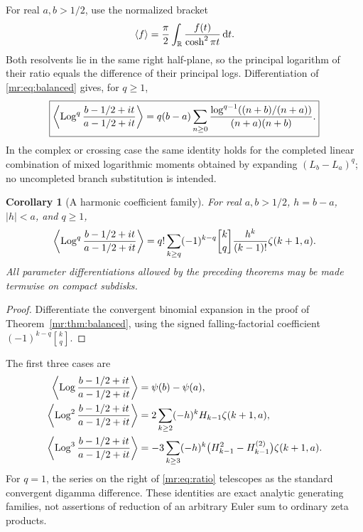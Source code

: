 \documentclass[11pt,letterpaper]{article}
\newtheorem{corollary}[theorem]{Corollary}
\theoremstyle{definition}\newtheorem{definition}[theorem]{Definition}
\theoremstyle{remark}\newtheorem{remark}[theorem]{Remark}
\newcommand{\dd}{\,\mathrm d}\newcommand{\M}{\mathcal M}
\newcommand{\stir}[2]{\genfrac{[}{]}{0pt}{}{#1}{#2}}
\begin{document}
For real $a,b>1/2$, use the normalized bracket
\begin{equation}\label{mr:eq:bracket}
 \langle f\rangle=\frac\pi2\int_\R\frac{f(t)}{\cosh^2\pi t}\dd t.
\end{equation}
Both resolvents lie in the same right half-plane, so the principal
logarithm of their ratio equals the difference of their principal logs.
Differentiation of \eqref{mr:eq:balanced} gives, for $q\ge1$,
\begin{equation}\label{mr:eq:ratio}
 \boxed{\left\langle
 \operatorname{Log}^q\frac{b-1/2+it}{a-1/2+it}\right\rangle
 =q(b-a)\sum_{n\ge0}
 \frac{\log^{q-1}((n+b)/(n+a))}{(n+a)(n+b)}.}
\end{equation}
In the complex or crossing case the same identity holds for the
completed linear combination of mixed logarithmic moments obtained by
expanding $(L_b-L_a)^q$; no uncompleted branch substitution is intended.

\begin{corollary}[A harmonic coefficient family]\label{mr:cor:harmonic}
For real $a,b>1/2$, $h=b-a$, $|h|<a$, and $q\ge1$,
\begin{equation}\label{mr:eq:harmonic}
 \left\langle\Log^q\frac{b-1/2+it}{a-1/2+it}\right\rangle
 =q!\sum_{k\ge q}(-1)^{k-q}\stir{k}{q}
       \frac{h^k}{(k-1)!}\zeta(k+1,a).
\end{equation}
All parameter differentiations allowed by the preceding theorems may
be made termwise on compact subdisks.
\end{corollary}
\begin{proof}
Differentiate the convergent binomial expansion in the proof of
Theorem~\ref{mr:thm:balanced}, using the signed falling-factorial
coefficient $(-1)^{k-q}\stir{k}{q}$.
\end{proof}
The first three cases are
\begin{align}
 \left\langle\operatorname{Log}\frac{b-1/2+it}{a-1/2+it}\right\rangle
 &=\psi(b)-\psi(a),\label{mr:eq:ratio1}\\
 \left\langle\operatorname{Log}^2\frac{b-1/2+it}{a-1/2+it}\right\rangle
 &=2\sum_{k\ge2}(-h)^kH_{k-1}\zeta(k+1,a),\label{mr:eq:ratio2}\\
 \left\langle\operatorname{Log}^3\frac{b-1/2+it}{a-1/2+it}\right\rangle
 &=-3\sum_{k\ge3}(-h)^k
       \bigl(H_{k-1}^2-H_{k-1}^{(2)}\bigr)\zeta(k+1,a).
 \label{mr:eq:ratio3}
\end{align}
For $q=1$, the series on the right of \eqref{mr:eq:ratio} telescopes
as the standard convergent digamma difference. These identities are
exact analytic generating families, not assertions of reduction of an
arbitrary Euler sum to ordinary zeta products.
\end{document}
